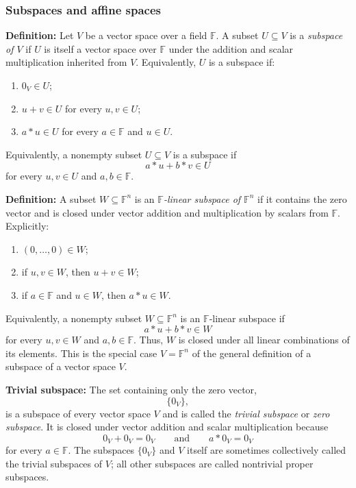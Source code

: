 \documentclass[a4paper,11pt,abstract=true]{scrartcl}
\theoremstyle{dotlessP}
\theoremstyle{dotlessS}
\theoremstyle{remark}
\theoremstyle{definition}
\begin{document}
\subsubsection{Subspaces and affine spaces}
\textbf{Definition:} Let $V$ be a vector space over a field $\mathbb{F}$.
A subset $U\subseteq V$ is a \emph{subspace of $V$} if $U$ is itself a vector
space over $\mathbb{F}$ under the addition and scalar multiplication inherited from
$V$. Equivalently, $U$ is a subspace if:
\begin{enumerate}
    \item $0_V\in U$;
    \item $u+v\in U$ for every $u,v\in U$;
    \item $a*u\in U$ for every $a\in \mathbb{F}$ and $u\in U$.
\end{enumerate}
Equivalently, a nonempty subset $U\subseteq V$ is a subspace if
\[
a*u+b*v\in U
\]
for every $u,v\in U$ and $a,b\in \mathbb{F}$.

\begin{definition_box}
\textbf{Definition:} A subset
$W\subseteq \mathbb{F}^n$ is an \emph{$\mathbb{F}$-linear subspace of $\mathbb{F}^n$} if it contains the
zero vector and is closed under vector addition and multiplication by scalars
from $\mathbb{F}$. Explicitly:
\begin{enumerate}
    \item $(0,\ldots,0)\in W$;
    \item if $u,v\in W$, then $u+v\in W$;
    \item if $a\in \mathbb{F}$ and $u\in W$, then $a*u\in W$.
\end{enumerate}
Equivalently, a nonempty subset $W\subseteq \mathbb{F}^n$ is an $\mathbb{F}$-linear subspace if
\[
a*u+b*v\in W
\]
for every $u,v\in W$ and $a,b\in \mathbb{F}$. Thus, $W$ is closed under all linear
combinations of its elements. This is the special case $V=\mathbb{F}^n$ of the general
definition of a subspace of a vector space $V$.
\end{definition_box}

\begin{example_box}
\textbf{Trivial subspace:} The set containing only the zero
vector,
\[
\{0_V\},
\]
is a subspace of every vector space $V$ and is called the \emph{trivial
subspace} or \emph{zero subspace}. It is closed under vector addition and
scalar multiplication because
\[
0_V+0_V=0_V
\qquad\text{and}\qquad
a*0_V=0_V
\]
for every $a\in \mathbb{F}$. The subspaces $\{0_V\}$ and $V$ itself are sometimes
collectively called the trivial subspaces of $V$; all other subspaces are
called nontrivial proper subspaces.
\end{example_box}
\end{document}
